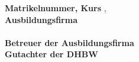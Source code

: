 \begin{titlepage}
\begin{spacing}{1.2}
\begin{tabbing}
        \textbf{Matrikelnummer, Kurs}                      \> , \\
        \textbf{Ausbildungsfirma}                          \> \\
                                                           \> \\
        \textbf{Betreuer der Ausbildungsfirma}             \> \\
        \ifdefined{}\textbf{Gutachter der DHBW} \> \\\fi
    \end{tabbing}
    \end{spacing}
    \vspace*{15mm}
\end{titlepage}
